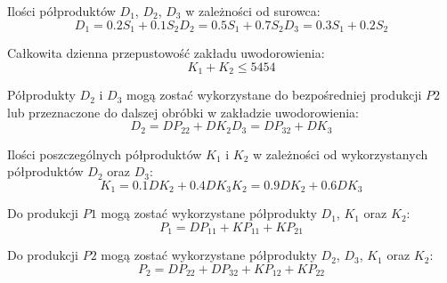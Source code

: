 \documentclass[a4paper,10pt,fleqn]{article}
\begin{document}
		Ilości półproduktów $D_1$, $D_2$, $D_3$ w zależności od surowca:
		\begin{subequations}
			\begin{equation}
				 D_1 = 0.2S_1 + 0.1S_2
			\end{equation}			
			\begin{equation}
				D_2 = 0.5S_1 + 0.7S_2
			\end{equation}
			\begin{equation}
				D_3 = 0.3S_1 + 0.2S_2
			\end{equation}
		\end{subequations}

		Całkowita dzienna przepustowość zakładu uwodorowienia:
		\begin{equation}
			K_1 + K_2 \leq 5454
		\end{equation}

		Półprodukty $D_2$ i $D_3$ mogą zostać wykorzystane do bezpośredniej produkcji $P2$ lub przeznaczone do dalszej obróbki w zakładzie uwodorowienia:
		\begin{subequations}
			\begin{equation}
				D_2 = DP_{22} + DK_2
			\end{equation}
			\begin{equation}
				D_3 = DP_{32} + DK_3
			\end{equation}
		\end{subequations}

		Ilości poszczególnych półproduktów $K_1$ i $K_2$ w zależności od wykorzystanych półproduktów $D_2$ oraz $D_3$:
		\begin{subequations}
			\begin{equation}
				K_1 = 0.1DK_2 + 0.4DK_3
			\end{equation}
			\begin{equation}
				K_2 = 0.9DK_2 + 0.6DK_3
			\end{equation}
		\end{subequations}

		Do produkcji $P1$ mogą zostać wykorzystane półprodukty $D_1$, $K_1$ oraz $K_2$:
		\begin{equation}
			P_1 = DP_{11} + KP_{11} + KP_{21}
		\end{equation}

		Do produkcji $P2$ mogą zostać wykorzystane półprodukty $D_2$, $D_3$, $K_1$ oraz $K_2$:
		\begin{equation}
			P_2 = DP_{22} + DP_{32} + KP_{12} + KP_{22} 
		\end{equation}
\end{document}
